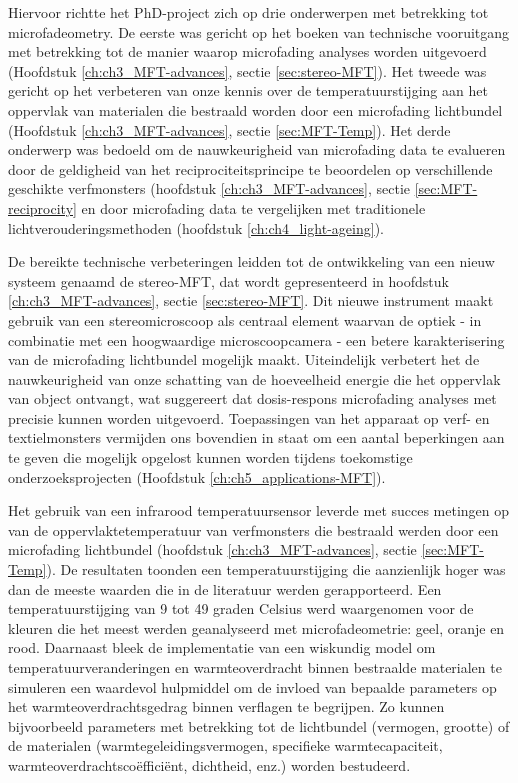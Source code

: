 Hiervoor richtte het PhD-project zich op drie onderwerpen met betrekking tot microfadeometry. De eerste was gericht op het boeken van technische vooruitgang met betrekking tot de manier waarop microfading analyses worden uitgevoerd (Hoofdstuk \ref{ch:ch3_MFT-advances}, sectie \ref{sec:stereo-MFT}). Het tweede was gericht op het verbeteren van onze kennis over de temperatuurstijging aan het oppervlak van materialen die bestraald worden door een microfading lichtbundel (Hoofdstuk \ref{ch:ch3_MFT-advances}, sectie \ref{sec:MFT-Temp}). Het derde onderwerp was bedoeld om de nauwkeurigheid van microfading data te evalueren door de geldigheid van het reciprociteitsprincipe te beoordelen op verschillende geschikte verfmonsters (hoofdstuk \ref{ch:ch3_MFT-advances}, sectie \ref{sec:MFT-reciprocity} en door microfading data te vergelijken met traditionele lichtverouderingsmethoden (hoofdstuk \ref{ch:ch4_light-ageing}).


De bereikte technische verbeteringen leidden tot de ontwikkeling van een nieuw systeem genaamd de stereo-MFT, dat wordt gepresenteerd in hoofdstuk \ref{ch:ch3_MFT-advances}, sectie \ref{sec:stereo-MFT}. Dit nieuwe instrument maakt gebruik van een stereomicroscoop als centraal element waarvan de optiek - in combinatie met een hoogwaardige microscoopcamera - een betere karakterisering van de microfading lichtbundel mogelijk maakt. Uiteindelijk verbetert het de nauwkeurigheid van onze schatting van de hoeveelheid energie die het oppervlak van object ontvangt, wat suggereert dat dosis-respons microfading analyses met precisie kunnen worden uitgevoerd. Toepassingen van het apparaat op verf- en textielmonsters vermijden ons bovendien in staat om een aantal beperkingen aan te geven die mogelijk opgelost kunnen worden tijdens toekomstige onderzoeksprojecten (Hoofdstuk \ref{ch:ch5_applications-MFT}).

Het gebruik van een infrarood temperatuursensor leverde met succes metingen op van de oppervlaktetemperatuur van verfmonsters die bestraald werden door een microfading lichtbundel (hoofdstuk \ref{ch:ch3_MFT-advances}, sectie \ref{sec:MFT-Temp}). De resultaten toonden een temperatuurstijging die aanzienlijk hoger was dan de meeste waarden die in de literatuur werden gerapporteerd. Een temperatuurstijging van 9 tot 49 graden Celsius werd waargenomen voor de kleuren die het meest werden geanalyseerd met microfadeometrie: geel, oranje en rood. Daarnaast bleek de implementatie van een wiskundig model om temperatuurveranderingen en warmteoverdracht binnen bestraalde materialen te simuleren een waardevol hulpmiddel om de invloed van bepaalde parameters op het warmteoverdrachtsgedrag binnen verflagen te begrijpen. Zo kunnen bijvoorbeeld parameters met betrekking tot de lichtbundel (vermogen, grootte) of de materialen (warmtegeleidingsvermogen, specifieke warmtecapaciteit, warmteoverdrachtscoëfficiënt, dichtheid, enz.) worden bestudeerd. 

